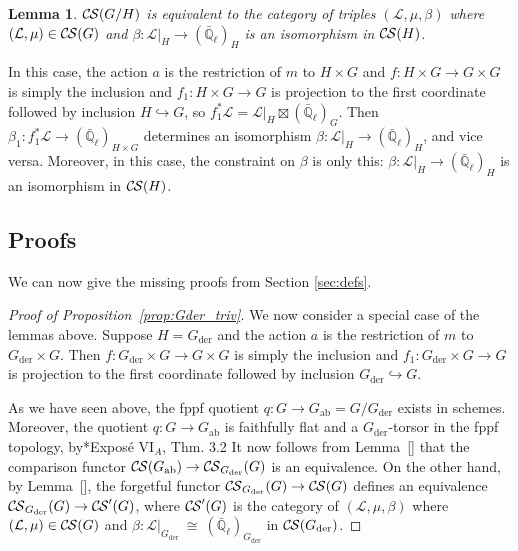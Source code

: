 \documentclass[10pt]{amsart}
\theoremstyle{plain}
\newtheorem{lemma}[theorem]{Lemma}
\theoremstyle{definition}
\newcommand{\EE}{\mathbb{\bar Q}_\ell}
\newcommand{\der}{_{\operatorname{der}}}
\newcommand{\ab}{_{\operatorname{ab}}}
\newcommand{\iso}{{\ \cong\ }}
\newcommand{\cs}[1]{{\mathcal{#1}}}
\newcommand{\CS}{{\mathcal{C\hskip-0.8pt S}}}
\begin{document}
\begin{lemma}
$\CS(G/H)$ is equivalent to the category of triples $(\cs{L},\mu,\beta)$ where $(\cs{L},\mu)\in \CS(G)$ and $\beta : \cs{L}\vert_H \to (\EE)_H$ is an isomorphism in $\CS(H)$.
\end{lemma}

In this case, the action $a$ is the restriction of $m$ to $H\times G$ and $f : H \times G\to G\times G$ is simply the inclusion and $f_1: H\times G \to G$ is projection to the first coordinate followed by inclusion $H \hookrightarrow G$, so $f_1^*\cs{L} = \cs{L}\vert_{H} \boxtimes (\EE)_G$. 
Then $\beta_1 : f_1^*\cs{L} \to (\EE)_{H\times G}$ determines an isomorphism $\beta : \cs{L}\vert_{H} \to (\EE)_{H}$, and vice versa.
Moreover, in this case, the constraint on $\beta$ is only this: $\beta : \cs{L}\vert_{H} \to (\EE)_{H}$ is an isomorphism in $\CS(H)$. 

\subsection{Proofs}

We can now give the missing proofs from Section \ref{sec:defs}.

\begin{proof}[Proof of Proposition~\ref{prop:Gder_triv}]
We now consider a special case of the lemmas above. 
Suppose $H = G\der$ and the action $a$ is the restriction of $m$ to $G\der\times G$.
Then $f : G\der \times G\to G\times G$ is simply the inclusion and $f_1: G\der\times G \to G$ is projection to the first coordinate followed by inclusion $G\der \hookrightarrow G$. 

As we have seen above, the fppf quotient $q : G\to G\ab = G/G\der$ exists in schemes.
Moreover, the quotient $q : G \to G\ab$ is faithfully flat and a $G\der$-torsor in the fppf topology, by\cite{SGA3}*{Expos\'e {VI}$_A$, Thm. 3.2}
It now follows from Lemma~[] that the comparison functor $\CS(G\ab)\to \CS_{G\der}(G)$ is an equivalence.
On the other hand, by Lemma~[], the forgetful functor $\CS_{G\der}(G)\to \CS(G)$ defines an equivalence $\CS_{G\der}(G)\to \CS'(G)$, where $\CS'(G)$ is the category of $(\cs{L},\mu,\beta)$ where $(\cs{L},\mu)\in \CS(G)$ and $\beta : \cs{L}\vert_{G\der} \iso (\EE)_{G\der}$ in $\CS(G\der)$.
\end{proof}
\end{document}
